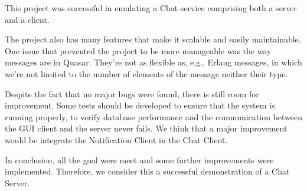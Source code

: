 This project was successful in emulating a Chat service comprising both a server and a client.

The project also has many features that make it scalable and easily maintainable. One issue that prevented the project to be more manageable was the way messages are in Quasar. They're not as flexible as, e.g., Erlang messages, in which we're not limited to the number of elements of the message neither their type.

Despite the fact that no major bugs were found, there is still room for improvement. 
Some tests should be developed to ensure that the system is running properly, to verify database performance and the communication between the GUI client and the server never fails. We think that a major improvement would be integrate the Notification Client in the Chat Client.

In conclusion, all the goal were meet and some further improvements were implemented. Therefore, we consider this a successful demonstration of a Chat Server.
